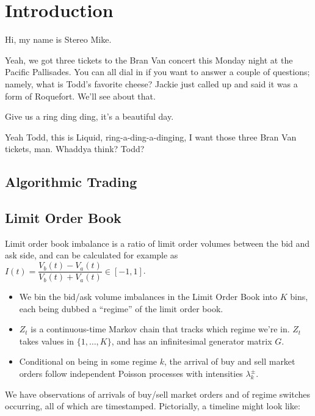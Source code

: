 \chapter{Introduction}
Hi, my name is Stereo Mike.

Yeah, we got three tickets to the Bran Van concert this Monday night at the Pacific Pallisades. You can all dial in if you want to answer a couple of questions; namely, what is Todd's favorite cheese? Jackie just called up and said it was a form of Roquefort. We'll see about that.

Give us a ring ding ding, it's a beautiful day.

Yeah Todd, this is Liquid, ring-a-ding-a-dinging, I want those three Bran Van tickets, man. Whaddya think? Todd?

\section{Algorithmic Trading}

\section{Limit Order Book}

Limit order book imbalance is a ratio of limit order volumes between the bid and ask side, and can be calculated for example as $I(t) = \dfrac{V_b(t) - V_a(t)}{V_b(t) + V_a(t)} \in [-1,1]$.
\begin{itemize}
\item We bin the bid/ask volume imbalances in the Limit Order Book into $K$ bins, each being dubbed a ``regime'' of the limit order book. 
\item $Z_t$ is a continuous-time Markov chain that tracks which regime we're in. $Z_t$ takes values in $\{1, \dots , K\}$, and has an infinitesimal generator matrix $G$.
\item Conditional on being in some regime $k$, the arrival of buy and sell market orders follow independent Poisson processes with intensities $\lambda^{\pm}_k$.
\end{itemize}

We have observations of arrivals of buy/sell market orders and of regime switches occurring, all of which are timestamped. Pictorially, a timeline might look like:

